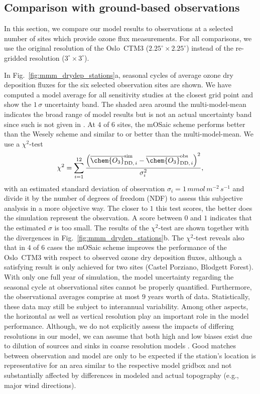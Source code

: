 \documentclass[gmd, manuscript]{copernicus}
\begin{document}
\subsection{Comparison with ground-based observations}
\label{subsec:obs}
In this section, we compare our model results to observations at a selected number of sites which provide ozone flux measurements. For all comparisons, we use the original resolution of the Oslo~CTM3 ($2.25^\circ\times 2.25^\circ$) instead of the re-gridded resolution ($3^\circ\times 3^\circ$).

In Fig.~\ref{fig:mmm_drydep_stations}a, seasonal cycles of average ozone dry deposition fluxes for the six selected observation sites are shown. We have computed a model average for all sensitivity studies at the closest grid point and show the $1\,\sigma$ uncertainty band. The shaded area around the multi-model-mean indicates the broad range of model results but is not an actual uncertainty band since such is not given in \citet{ACP:Hardacre2015}. At $4$ of $6$ sites, the mOSaic scheme performs better than the Wesely scheme and similar to or better than the multi-model-mean. We use a $\chi^2$-test
\begin{equation}
  \chi^2 = \sum_{i=1}^{12}\frac{\left(\overline{\chem{O_3}}_{\text{DD,\,}i}^\text{sim}-\overline{\chem{O_3}}_{\text{DD,\,}i}^\text{obs}\right)^2}{\sigma_i^2},
\end{equation}
with an estimated standard deviation of observation $\sigma_i=1\,\unit{mmol\,m^{-2}\,s^{-1}}$ and divide it by the number of degrees of freedom (NDF) to assess this subjective analysis in a more objective way. The closer to $1$ this test scores, the better does the simulation represent the observation. A score between $0$ and $1$ indicates that the estimated $\sigma$ is too small. The results of the $\chi^2$-test are shown together with the divergences in Fig.~\ref{fig:mmm_drydep_stations}b. The $\chi^2$-test reveals also that in $4$ of $6$ cases the mOSaic scheme improves the performance of the Oslo~CTM3 with respect to observed ozone dry deposition fluxes, although a satisfying result is only achieved for two sites (Castel Porziano, Blodgett Forest).
With only one full year of simulation, the model uncertainty regarding the seasonal cycle at observational sites cannot be properly quantified. Furthermore, the observational averages comprise at most $9$ years worth of data. Statistically, these data may still be subject to interannual variability. Among other aspects, the horizontal as well as vertical resolution play an important role in the model performance. Although, we do not explicitly assess the impacts of differing resolutions in our model, we can assume that both high and low biases exist due to dilution of sources and sinks in coarse resolution models \citep{AE:Schaap2015}. Good matches between observation and model are only to be expected if the station's location is representative for an area similar to the respective model gridbox and not substantially affected by differences in modeled and actual topography (e.g., major wind directions).
\end{document}
